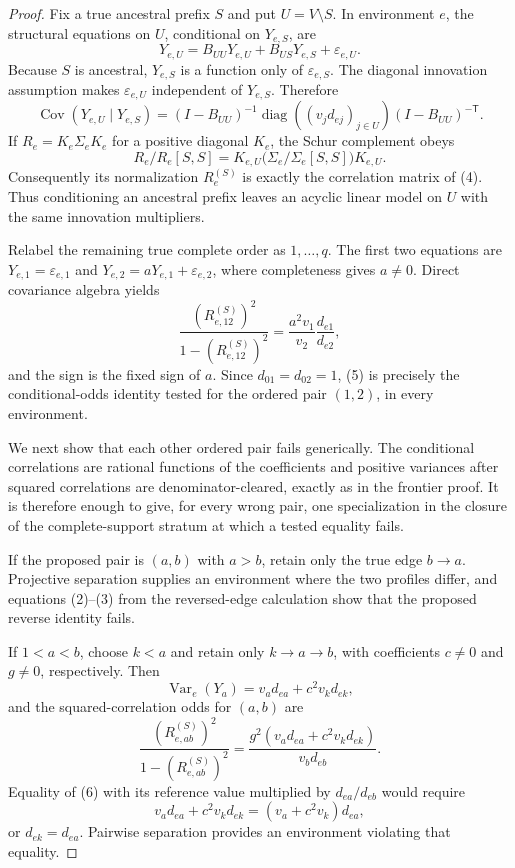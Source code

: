 \documentclass{article}
\begin{document}
\begin{proof}
Fix a true ancestral prefix \(S\) and put \(U=V\setminus S\).  In environment \(e\), the structural equations on \(U\), conditional on \(Y_{e,S}\), are
\[
 Y_{e,U}=B_{UU}Y_{e,U}+B_{US}Y_{e,S}+\varepsilon_{e,U}.
\]
Because \(S\) is ancestral, \(Y_{e,S}\) is a function only of \(\varepsilon_{e,S}\).  The diagonal innovation assumption makes \(\varepsilon_{e,U}\) independent of \(Y_{e,S}\).  Therefore
\[
 \operatorname{Cov}(Y_{e,U}\mid Y_{e,S})
 =(I-B_{UU})^{-1}\operatorname{diag}((v_jd_{ej})_{j\in U})
 (I-B_{UU})^{-\mathsf T}. \tag{4}
\]
If \(R_e=K_e\Sigma_eK_e\) for a positive diagonal \(K_e\), the Schur complement obeys
\[
 R_e/R_e[S,S]
 =K_{e,U}\bigl(\Sigma_e/\Sigma_e[S,S]\bigr)K_{e,U}.
\]
Consequently its normalization \(R_e^{(S)}\) is exactly the correlation matrix of (4).  Thus conditioning an ancestral prefix leaves an acyclic linear model on \(U\) with the same innovation multipliers.

Relabel the remaining true complete order as \(1,\ldots,q\).  The first two equations are
\(Y_{e,1}=\varepsilon_{e,1}\) and
\(Y_{e,2}=aY_{e,1}+\varepsilon_{e,2}\), where completeness gives \(a\ne0\).  Direct covariance algebra yields
\[
 \frac{(R_{e,12}^{(S)})^2}{1-(R_{e,12}^{(S)})^2}
 =\frac{a^2v_1}{v_2}\frac{d_{e1}}{d_{e2}}, \tag{5}
\]
and the sign is the fixed sign of \(a\).  Since \(d_{01}=d_{02}=1\), (5) is precisely the conditional-odds identity tested for the ordered pair \((1,2)\), in every environment.

We next show that each other ordered pair fails generically.  The conditional correlations are rational functions of the coefficients and positive variances after squared correlations are denominator-cleared, exactly as in the frontier proof.  It is therefore enough to give, for every wrong pair, one specialization in the closure of the complete-support stratum at which a tested equality fails.

If the proposed pair is \((a,b)\) with \(a>b\), retain only the true edge \(b\to a\).  Projective separation supplies an environment where the two profiles differ, and equations (2)--(3) from the reversed-edge calculation show that the proposed reverse identity fails.

If \(1<a<b\), choose \(k<a\) and retain only \(k\to a\to b\), with coefficients \(c\ne0\) and \(g\ne0\), respectively.  Then
\[
 \operatorname{Var}_e(Y_a)=v_ad_{ea}+c^2v_kd_{ek},
\]
and the squared-correlation odds for \((a,b)\) are
\[
 \frac{(R_{e,ab}^{(S)})^2}{1-(R_{e,ab}^{(S)})^2}
 =\frac{g^2(v_ad_{ea}+c^2v_kd_{ek})}{v_bd_{eb}}. \tag{6}
\]
Equality of (6) with its reference value multiplied by \(d_{ea}/d_{eb}\) would require
\[
 v_ad_{ea}+c^2v_kd_{ek}=(v_a+c^2v_k)d_{ea},
\]
or \(d_{ek}=d_{ea}\).  Pairwise separation provides an environment violating that equality.


\end{proof}
\end{document}
